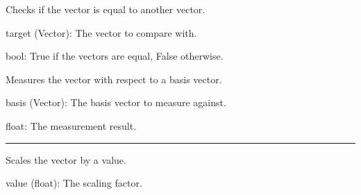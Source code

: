 \documentclass[letterpaper,10pt,english]{sphinxmanual}
\begin{document}
\begin{fulllineitems}
\begin{fulllineitems}
\label{\detokenize{index:utils.tensor.Vector.equal}}
\pysigstartsignatures
{}
\pysigstopsignatures
\sphinxAtStartPar
Checks if the vector is equal to another vector.
\begin{description}
\sphinxAtStartPar
target (Vector): The vector to compare with.

\sphinxAtStartPar
bool: True if the vectors are equal, False otherwise.

\end{description}

\end{fulllineitems}


\begin{fulllineitems}
\label{\detokenize{index:utils.tensor.Vector.measure}}
\pysigstartsignatures
{}
\pysigstopsignatures
\sphinxAtStartPar
Measures the vector with respect to a basis vector.
\begin{description}
\sphinxAtStartPar
basis (Vector): The basis vector to measure against.

\sphinxAtStartPar
float: The measurement result.

\end{description}

\end{fulllineitems}



\bigskip\hrule\bigskip


\begin{fulllineitems}
\label{\detokenize{index:utils.tensor.Vector.scale}}
\pysigstartsignatures
{}
\pysigstopsignatures
\sphinxAtStartPar
Scales the vector by a value.
\begin{description}
\sphinxAtStartPar
value (float): The scaling factor.


\end{description}
\end{fulllineitems}
\end{fulllineitems}
\end{document}
